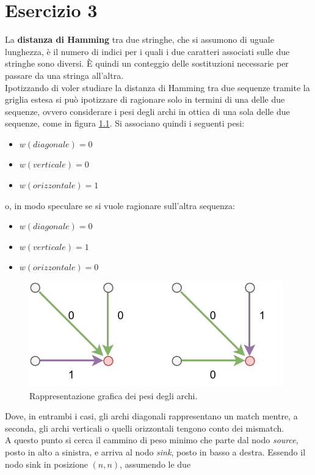 \documentclass[a4paper,12pt, oneside]{book}
\begin{document}
\chapter{Esercizio 3}
La \textbf{distanza di Hamming} tra due stringhe, che si assumono di uguale
lunghezza, è 
il numero di indici per i quali i due caratteri associati sulle due stringhe
sono diversi. È quindi un conteggio delle sostituzioni necessarie per passare da
una stringa all'altra.\\
Ipotizzando di voler studiare la distanza di Hamming tra due sequenze tramite la
griglia estesa si può ipotizzare di ragionare solo in termini di una delle due
sequenze, ovvero considerare i pesi degli archi in ottica di una sola delle due
sequenze, come in figura \ref{fig:pes3}. Si associano quindi i seguenti pesi:
\begin{itemize}
  \item $w(diagonale)=0$
  \item $w(verticale)=0$
  \item $w(orizzontale)=1$
\end{itemize}
o, in modo speculare se si vuole ragionare sull'altra sequenza:
\begin{itemize}
  \item $w(diagonale)=0$
  \item $w(verticale)=1$
  \item $w(orizzontale)=0$
\end{itemize}
\begin{figure}
  \centering
  \includegraphics[scale = 1.3]{img/es31.pdf}
  \caption{Rappresentazione grafica dei pesi degli archi.}
  \label{fig:pes3}
\end{figure}
Dove, in entrambi i casi, gli archi diagonali rappresentano un match mentre, a
seconda, gli archi verticali o quelli orizzontali tengono conto dei mismatch.\\
A questo punto si cerca il cammino di peso minimo che parte dal nodo
\textit{source}, posto in alto a sinistra, e arriva al nodo \textit{sink}, posto
in basso a destra. Essendo il nodo sink in posizione $(n,n)$, assumendo le due 
\end{document}
